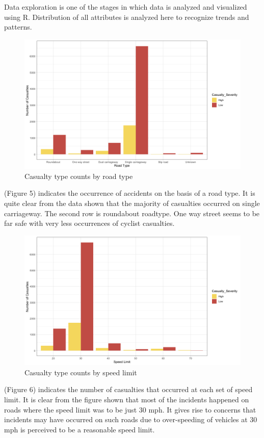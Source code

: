 \documentclass[
  a4paper,
]{article}
\begin{document}
Data exploration is one of the stages in which data is analyzed and
visualized using R. Distribution of all attributes is analyzed here to
recognize trends and patterns.

\begin{figure}[h!]

{\centering \includegraphics[width=0.75\linewidth]{rt} 

}

\caption{Casualty type counts by road type}\label{fig:unnamed-chunk-6}
\end{figure}

(Figure 5) indicates the occurrence of accidents on the basis of a road
type. It is quite clear from the data shown that the majority of
casualties occurred on single carriageway. The second row is roundabout
roadtype. One way street seems to be far safe with very less occurrences
of cyclist casualties.

\begin{figure}[h!]

{\centering \includegraphics[width=0.75\linewidth]{sl} 

}

\caption{Casualty type counts by speed limit}\label{fig:unnamed-chunk-7}
\end{figure}

(Figure 6) indicates the number of casualties that occurred at each set
of speed limit. It is clear from the figure shown that most of the
incidents happened on roads where the speed limit was to be just 30 mph.
It gives rise to concerns that incidents may have occurred on such roads
due to over-speeding of vehicles at 30 mph is perceived to be a
reasonable speed limit.
\end{document}
